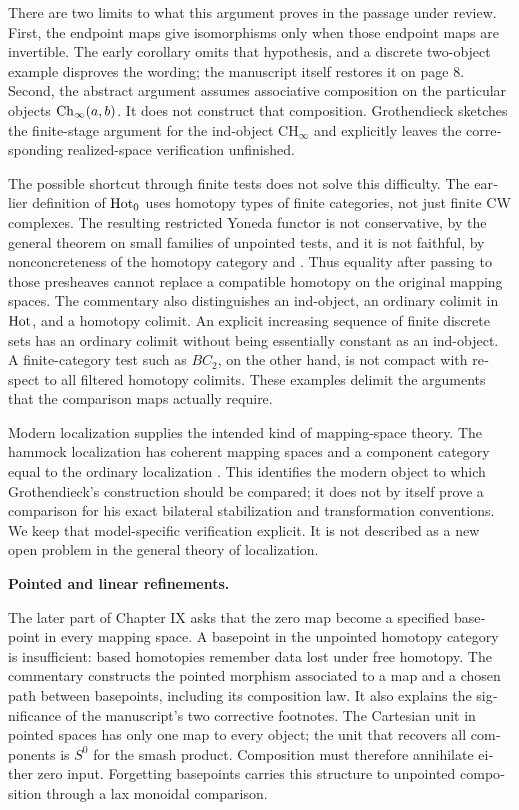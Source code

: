 \begin{otherlanguage}{english}
There are two limits to what this argument proves in the passage under review. First, the endpoint maps give isomorphisms only when those endpoint maps are invertible. The early corollary omits that hypothesis, and a discrete two-object example disproves the wording; the manuscript itself restores it on page 8. Second, the abstract argument assumes associative composition on the particular objects $\mathrm{Ch}_\infty(a,b)$. It does not construct that composition. Grothendieck sketches the finite-stage argument for the ind-object $\mathrm{CH}_\infty$ and explicitly leaves the corresponding realized-space verification unfinished.

The possible shortcut through finite tests does not solve this difficulty. The earlier definition of $\mathrm{Hot}_0$ uses homotopy types of finite categories, not just finite CW complexes. The resulting restricted Yoneda functor is not conservative, by the general theorem on small families of unpointed tests, and it is not faithful, by nonconcreteness of the homotopy category \citep[Theorem~2.1]{ArlinChristensen2023} and \citet[pp.~1, 5 of the reprint]{Freyd1970}. Thus equality after passing to those presheaves cannot replace a compatible homotopy on the original mapping spaces. The commentary also distinguishes an ind-object, an ordinary colimit in $\mathrm{Hot}$, and a homotopy colimit. An explicit increasing sequence of finite discrete sets has an ordinary colimit without being essentially constant as an ind-object. A finite-category test such as $BC_2$, on the other hand, is not compact with respect to all filtered homotopy colimits. These examples delimit the arguments that the comparison maps actually require.

Modern localization supplies the intended kind of mapping-space theory. The hammock localization has coherent mapping spaces and a component category equal to the ordinary localization \citep[\S2]{DwyerKan1980Calculating}. This identifies the modern object to which Grothendieck's construction should be compared; it does not by itself prove a comparison for his exact bilateral stabilization and transformation conventions. We keep that model-specific verification explicit. It is not described as a new open problem in the general theory of localization.

\medskip\noindent\textbf{Pointed and linear refinements.}

The later part of Chapter IX asks that the zero map become a specified basepoint in every mapping space. A basepoint in the unpointed homotopy category is insufficient: based homotopies remember data lost under free homotopy. The commentary constructs the pointed morphism associated to a map and a chosen path between basepoints, including its composition law. It also explains the significance of the manuscript's two corrective footnotes. The Cartesian unit in pointed spaces has only one map to every object; the unit that recovers all components is $S^0$ for the smash product. Composition must therefore annihilate either zero input. Forgetting basepoints carries this structure to unpointed composition through a lax monoidal comparison.


\end{otherlanguage}
